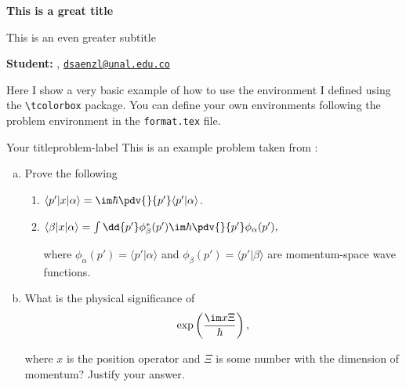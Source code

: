 





\begin{Large}
    \textsf{\textbf{This is a great title}}
    
    This is an even greater subtitle
\end{Large}

\vspace{1ex}

\textsf{\textbf{Student:}} , \href{mailto:dsaenzl@unal.edu.co}{\texttt{dsaenzl@unal.edu.co}}\\


\vspace{1ex}

Here I show a very basic example of how to use the  environment I defined using the \verb|\tcolorbox| package. You can define your own environments following the problem environment in the \texttt{format.tex} file.

\begin{problem}{Your title}{problem-label}
This is an example problem taken from \cite{Sakurai2020}:

\begin{enumerate}[(a)]
    \item Prove the following
    \begin{enumerate}[label = (\roman*)]
        \item $\langle p' | x | \alpha \rangle = \im \hbar \pdv{}{p'} \langle p' | \alpha \rangle$.

        \item $\langle \beta | x | \alpha \rangle = \int \dd{p'} \phi_{\beta}^{*} (p') \im \hbar \pdv{}{p'} \phi_{\alpha} (p'),$

        where $\phi_{\alpha}(p') = \langle p' | \alpha \rangle$ and $\phi_{\beta}(p') = \langle p' | \beta \rangle$ are momentum-space wave functions.
    \end{enumerate}

    \item What is the physical significance of 
    \[
    \exp\left(\dfrac{\im x \Xi}{\hbar}\right),
    \]

    where $x$ is the position operator and $\Xi$ is some number with the dimension of momentum? Justify your answer.
\end{enumerate}
\end{problem}

